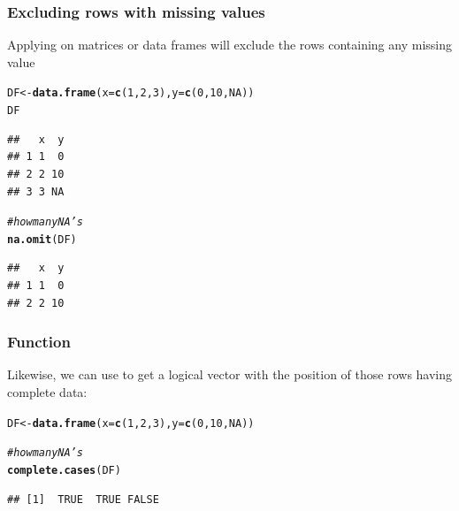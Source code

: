 \documentclass[12pt]{beamer}\usepackage[]{graphicx}\usepackage[]{color}
\makeatletter
\newcommand{\hlnum}[1]{\textcolor[rgb]{0.686,0.059,0.569}{#1}}%
\newcommand{\hlcom}[1]{\textcolor[rgb]{0.678,0.584,0.686}{\textit{#1}}}%
\newcommand{\hlstd}[1]{\textcolor[rgb]{0.345,0.345,0.345}{#1}}%
\newcommand{\hlkwb}[1]{\textcolor[rgb]{0.69,0.353,0.396}{#1}}%
\newcommand{\hlkwc}[1]{\textcolor[rgb]{0.333,0.667,0.333}{#1}}%
\newcommand{\hlkwd}[1]{\textcolor[rgb]{0.737,0.353,0.396}{\textbf{#1}}}%
\newenvironment{kframe}{%
 \def\at@end@of@kframe{}%
 \ifinner\ifhmode%
  \def\at@end@of@kframe{\end{minipage}}%
  \begin{minipage}{\columnwidth}%
 \fi\fi%
 \def\FrameCommand##1{\hskip\@totalleftmargin \hskip-\fboxsep
 \colorbox{shadecolor}{##1}\hskip-\fboxsep
     \hskip-\linewidth \hskip-\@totalleftmargin \hskip\columnwidth}%
 \MakeFramed {\advance\hsize-\width
   \@totalleftmargin\z@ \linewidth\hsize
   \@setminipage}}%
 {\par\unskip\endMakeFramed%
 \at@end@of@kframe}
\newenvironment{knitrout}{}{} %
\makeatother
\begin{document}
\begin{frame}[fragile]
\frametitle{Excluding rows with missing values}

Applying {\hilit {}} on matrices or data frames will exclude the rows containing any missing value
\begin{knitrout}\footnotesize
{}\color{fgcolor}\begin{kframe}
\begin{alltt}
\hlstd{DF} \hlkwb{<-} \hlkwd{data.frame}\hlstd{(}\hlkwc{x} \hlstd{=} \hlkwd{c}\hlstd{(}\hlnum{1}\hlstd{,} \hlnum{2}\hlstd{,} \hlnum{3}\hlstd{),} \hlkwc{y} \hlstd{=} \hlkwd{c}\hlstd{(}\hlnum{0}\hlstd{,} \hlnum{10}\hlstd{,} \hlnum{NA}\hlstd{))}
\hlstd{DF}
\end{alltt}
\begin{verbatim}
##   x  y
## 1 1  0
## 2 2 10
## 3 3 NA
\end{verbatim}
\begin{alltt}
\hlcom{# how many NA's}
\hlkwd{na.omit}\hlstd{(DF)}
\end{alltt}
\begin{verbatim}
##   x  y
## 1 1  0
## 2 2 10
\end{verbatim}
\end{kframe}
\end{knitrout}

\end{frame}


\begin{frame}[fragile]
\frametitle{Function }

Likewise, we can use {\hilit {}} to get a logical vector with the position of those rows having complete data:
\begin{knitrout}\footnotesize
{}\color{fgcolor}\begin{kframe}
\begin{alltt}
\hlstd{DF} \hlkwb{<-} \hlkwd{data.frame}\hlstd{(}\hlkwc{x} \hlstd{=} \hlkwd{c}\hlstd{(}\hlnum{1}\hlstd{,} \hlnum{2}\hlstd{,} \hlnum{3}\hlstd{),} \hlkwc{y} \hlstd{=} \hlkwd{c}\hlstd{(}\hlnum{0}\hlstd{,} \hlnum{10}\hlstd{,} \hlnum{NA}\hlstd{))}

\hlcom{# how many NA's}
\hlkwd{complete.cases}\hlstd{(DF)}
\end{alltt}
\begin{verbatim}
## [1]  TRUE  TRUE FALSE
\end{verbatim}
\end{kframe}
\end{knitrout}

\end{frame}
\end{document}
